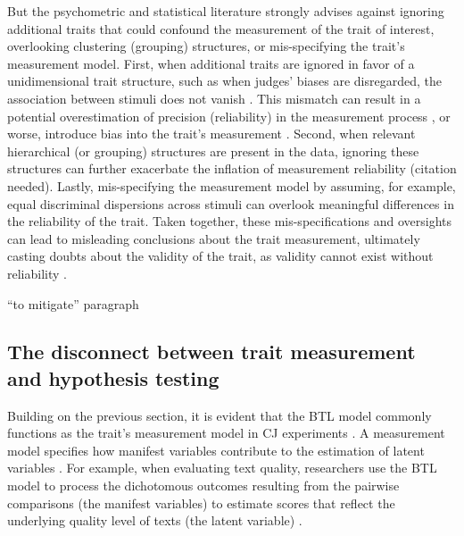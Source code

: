 \documentclass[
  authoryear,
  preprint,
  1p]{elsarticle}
\begin{document}
But the psychometric and statistical literature strongly advises against
ignoring additional traits that could confound the measurement of the
trait of interest, overlooking clustering (grouping) structures, or
mis-specifying the trait's measurement model. First, when additional
traits are ignored in favor of a unidimensional trait structure, such as
when judges' biases are disregarded, the association between stimuli
does not vanish \citep[pp.~346]{vanderLinden_et_al_2017_II}. This
mismatch can result in a potential overestimation of precision
(reliability) in the measurement process
\citep[pp.~340-341]{Hoyle_et_al_2023}, or worse, introduce bias into the
trait's measurement \citep{Ackerman_1989}. Second, when relevant
hierarchical (or grouping) structures are present in the data, ignoring
these structures can further exacerbate the inflation of measurement
reliability (citation needed). Lastly, mis-specifying the measurement
model by assuming, for example, equal discriminal dispersions across
stimuli can overlook meaningful differences in the reliability of the
trait. Taken together, these mis-specifications and oversights can lead
to misleading conclusions about the trait measurement, ultimately
casting doubts about the validity of the trait, as validity cannot exist
without reliability \citep[pp.~2]{Perron_et_al_2015}.

{``to mitigate'' paragraph}

\subsection{The disconnect between trait measurement and hypothesis
testing}\label{sec-theory-issue2}

Building on the previous section, it is evident that the BTL model
commonly functions as the trait's measurement model in CJ experiments
\citep{Andrich_1978, Bramley_2008}. A measurement model specifies how
manifest variables contribute to the estimation of latent variables
\citep{Everitt_et_al_2010}. For example, when evaluating text quality,
researchers use the BTL model to process the dichotomous outcomes
resulting from the pairwise comparisons (the manifest variables) to
estimate scores that reflect the underlying quality level of texts (the
latent variable)
\citep{Laming_2004, Pollitt_2012b, Whitehouse_2012, vanDaal_et_al_2016, Lesterhuis_2018_thesis, Coertjens_et_al_2017, Goossens_et_al_2018, Bouwer_et_al_2023}.
\end{document}
